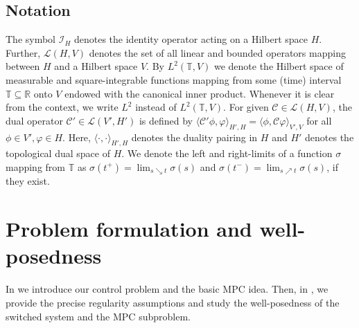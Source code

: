 \documentclass[reqno]{amsart}
\newcommand{\Li}{\mathcal{L}}
\newcommand{\R}{\mathbb R}
\newcommand{\timeInt}{\mathbb{T}}
\newcommand{\cOper}{\calC}
\newcommand{\switch}{\sigma}
\newcommand{\calC}{\mathcal{C}}
\newcommand{\calI}{\mathcal{I}}
\newcommand{\abbr}[1]{\textsf{#1}\xspace}
\newcommand{\MPC}{\abbr{MPC}}
\begin{document}
\subsection{Notation}
%
The symbol $\calI_H$ denotes the identity operator acting on a Hilbert space $H$. Further, $\Li(H,V)$ denotes the set of all linear and bounded operators mapping between $H$ and a Hilbert space $V$. By $L^2(\timeInt,V)$ we denote the Hilbert space of measurable and square-integrable functions mapping from some (time) interval $\timeInt\subseteq \R$ onto $V$ endowed with the canonical inner product. Whenever it is clear from the context, we write $L^2$ instead of $L^2(\timeInt,V)$. For given $\cOper\in \Li(H,V)$, the dual operator $\cOper'\in \Li(V',H')$ is defined by $ \langle \cOper'\phi,\varphi\rangle_{H',H}=\langle \phi,\cOper\varphi\rangle_{V',V}$ for all $\phi\in V', \varphi\in H$. Here, $\langle \cdot,\cdot\rangle_{H',H}$ denotes the duality pairing in $H$ and $H'$ denotes the topological dual space of $H$. 
We denote the left and right-limits of a function $\switch$ mapping from $\timeInt$ as $\switch(t^+)= \lim_{s\searrow t} \switch(s)$ and $\switch(t^-) = \lim_{s\nearrow t} \switch(s)$, if they exist.
%
\section{Problem formulation and well-posedness}
\label{sec: problem formulation}
%
In  we introduce our control problem and the basic \MPC idea. Then, in , we provide the precise regularity assumptions and study the well-posedness of the switched system and the \MPC subproblem.
%
\end{document}
